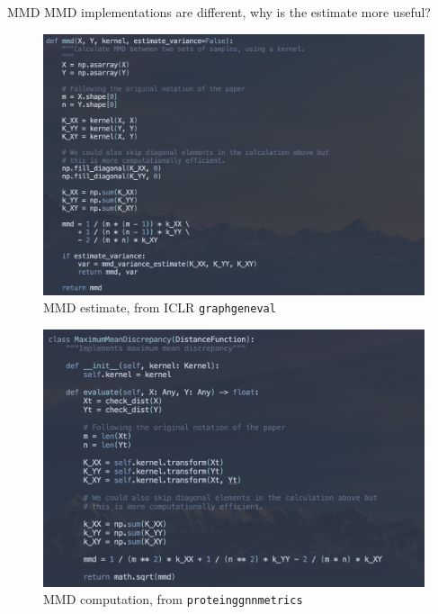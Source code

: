 \documentclass[aspectratio=169, 10pt, dvipsnames, handout]{beamer}
\begin{document}
\begin{frame}[fragile]{MMD}
  MMD implementations are different, why is the estimate more useful?\\
  \begin{minipage}{.45\textwidth}
  \begin{figure}
    \centering
    \includegraphics[width=\textwidth]{figures/mmd_estimate.png}
    \caption{MMD estimate, from ICLR \texttt{graphgeneval}}
    \label{fig:mmd_estimate}
  \end{figure}
  \end{minipage}%
  \hfill
  \begin{minipage}{.45\textwidth}
  \begin{figure}
    \centering
    \includegraphics[width=\textwidth]{figures/mmd_current.png}
    \caption{MMD computation, from \texttt{proteinggnnmetrics}}
    \label{fig:mmd_current}
  \end{figure}
\end{minipage}
\end{frame}
\end{document}
